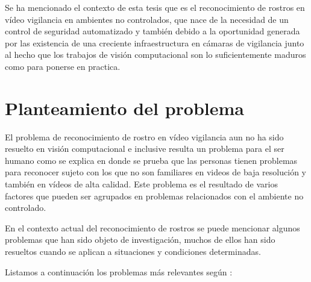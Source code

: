 Se ha mencionado el contexto de esta tesis que es el reconocimiento de rostros en vídeo vigilancia en ambientes no controlados, que nace de la necesidad de un control de seguridad automatizado y también debido a la oportunidad generada por las existencia de una creciente infraestructura en cámaras de vigilancia junto al hecho que los trabajos de visión computacional son lo suficientemente maduros como para ponerse en practica.


\section{Planteamiento del problema}\label{ssc:PlanteamientoProblema}
El problema de reconocimiento de rostro en vídeo vigilancia aun no ha sido resuelto en visión computacional e inclusive resulta un problema para el ser humano como se explica en \cite{burton1999face} donde se prueba que las personas tienen problemas para reconocer sujeto con los que no son familiares en videos de baja resolución y también en vídeos de alta calidad.
Este problema es el resultado de varios factores que pueden ser agrupados en problemas relacionados con el ambiente no controlado.

En el contexto actual del reconocimiento de rostros se puede mencionar algunos problemas que han sido objeto de investigación, muchos de ellos han sido resueltos cuando se aplican a situaciones y condiciones determinadas. 

Listamos a continuación  los problemas más relevantes según \cite{gross2001quo}:

